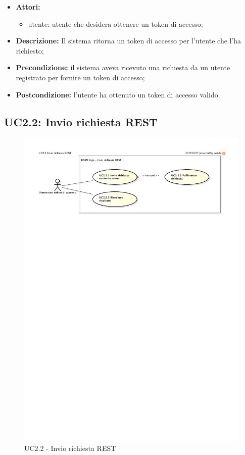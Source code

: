 \begin{itemize}
	\item \textbf{Attori:}
	\begin{itemize}
		\item utente: utente che desidera ottenere un token di accesso;
	\end{itemize}
	\item \textbf{Descrizione:} Il sistema ritorna un token di accesso per l'utente che l'ha richiesto;
	\item \textbf{Precondizione:} il sistema aveva ricevuto una richiesta da un utente registrato per fornire un token di accesso;
	\item \textbf{Postcondizione:} l'utente ha ottenuto un token di accesso valido.
\end{itemize}


\pagebreak

\subsection{UC2.2: Invio richiesta REST}

\begin{figure}[htbp]
	\centering
	\centerline{\includegraphics{./images/UC2_2.pdf}}
	\caption{UC2.2 - Invio richiesta REST}
\end{figure}

